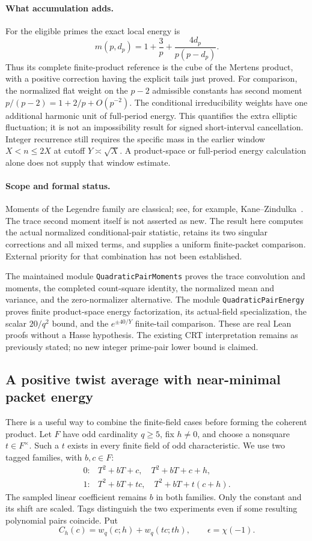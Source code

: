 \documentclass[11pt]{article}
\begin{document}
\paragraph{What accumulation adds.}
For the eligible primes the exact local energy is
\[
 m(p,d_p)=1+\frac3p+\frac{4d_p}{p(p-d_p)}.
\]
Thus its complete finite-product reference is the cube of the Mertens
product, with a positive correction having the explicit tails just proved.
For comparison, the normalized flat weight on the \(p-2\) admissible
constants has second moment \(p/(p-2)=1+2/p+O(p^{-2})\).
The conditional irreducibility weights have one additional harmonic
unit of full-period energy. This quantifies the extra elliptic
fluctuation; it is not an impossibility result for signed short-interval
cancellation. Integer recurrence still requires the specific mass
in the earlier window \(X<n\leq2X\) at cutoff \(Y\asymp\sqrt X\).
A product-space or full-period energy calculation alone does not supply
that window estimate.

\paragraph{Scope and formal status.}
Moments of the Legendre family are classical; see, for example,
Kane--Zindulka~\cite{KaneZindulka}. The trace second moment itself is
not asserted as new. The result here computes the actual normalized
conditional-pair statistic, retains its two singular corrections and
all mixed terms, and supplies a uniform finite-packet comparison.
External priority for that combination has not been established.

The maintained module \texttt{QuadraticPairMoments} proves the trace
convolution and moments, the completed count-square identity, the
normalized mean and variance, and the zero-normalizer alternative.
The module \texttt{QuadraticPairEnergy} proves finite product-space
energy factorization, its actual-field specialization, the scalar
\(20/q^2\) bound, and the \(e^{\pm40/Y}\) finite-tail comparison.
These are real Lean proofs without a Hasse hypothesis.
The existing CRT interpretation remains as previously stated; no
new integer prime-pair lower bound is claimed.

\subsection{A positive twist average with near-minimal packet energy}

There is a useful way to combine the finite-field cases before forming
the coherent product. Let \(F\) have odd cardinality \(q\geq5\), fix
\(h\ne0\), and choose a nonsquare \(t\in F^\times\). Such a \(t\)
exists in every finite field of odd characteristic. We use two tagged
families, with \(b,c\in F\):
\[
\begin{array}{ll}
 0:& T^2+bT+c,\quad T^2+bT+c+h,\\
 1:& T^2+bT+tc,\quad T^2+bT+t(c+h).
\end{array}
\]
The sampled linear coefficient remains \(b\) in both families.
Only the constant and its shift are scaled. Tags distinguish the two
experiments even if some resulting polynomial pairs coincide. Put
\[
 C_h(c)=w_q(c;h)+w_q(tc;th),\qquad \epsilon=\chi(-1).
\]
\end{document}

